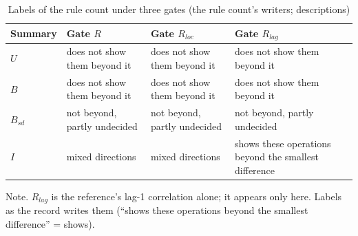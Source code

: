 \begin{table}[htbp]
\caption{Labels of the rule count under three gates (the rule count's writers; descriptions)}
\label{tab:rlag}
\footnotesize
\begin{tabularx}{\linewidth}{@{}lXXX@{}}
\toprule
Summary & Gate $R$ & Gate $R_{loc}$ & Gate $R_{lag}$ \\
\midrule
$U$ & does not show them beyond it & does not show them beyond it & does not show them beyond it \\
$B$ & does not show them beyond it & does not show them beyond it & does not show them beyond it \\
$B_{sd}$ & not beyond, partly undecided & not beyond, partly undecided & not beyond, partly undecided \\
$I$ & mixed directions & mixed directions & shows these operations beyond the smallest difference \\
\bottomrule
\end{tabularx}
\par\smallskip\footnotesize Note. $R_{lag}$ is the reference's lag-1 correlation alone; it appears only here. Labels as the record writes them (``shows these operations beyond the smallest difference'' = shows).
\end{table}
